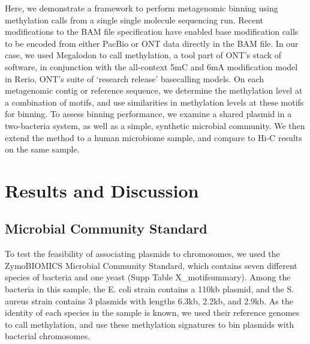 Here, we demonstrate a framework to perform metagenomic binning using methylation calls from a single single molecule sequencing run. Recent modifications to the BAM file specification have enabled base modification calls to be encoded from either PacBio or ONT data directly in the BAM file.  In our case, we used Megalodon to call methylation, a tool part of ONT’s stack of software, in conjunction with the all-context 5mC and 6mA modification model in Rerio, ONT’s suite of ‘research release’ basecalling models. On each metagenomic contig or reference sequence, we determine the methylation level at a combination of motifs, and use similarities in methylation levels at these motifs for binning. To assess binning performance, we examine a shared plasmid in a two-bacteria system, as well as a simple, synthetic microbial community. We then extend the method to a human microbiome sample, and compare to Hi-C results on the same sample.


\section{Results and Discussion}
\label{sec:results}

\subsection{Microbial Community Standard}
\label{sec:zymo}

To test the feasibility of associating plasmids to chromosomes, we used the ZymoBIOMICS Microbial Community Standard, which contains seven different species of bacteria and one yeast (Supp Table X_motifsummary). Among the bacteria in this sample, the E. coli strain contains a 110kb plasmid, and the S. aureus strain contains 3 plasmids with lengths 6.3kb, 2.2kb, and 2.9kb. As the identity of each species in the sample is known, we used their reference genomes to call methylation, and use these methylation signatures to bin plasmids with bacterial chromosomes.

